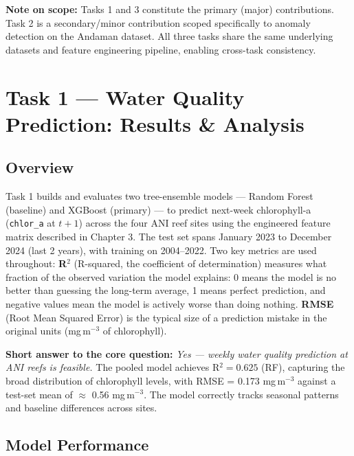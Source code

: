 \documentclass[12pt,a4paper]{report}
\begin{document}
\vspace{1em}
\begin{challengebox}
\textbf{Note on scope:} Tasks 1 and 3 constitute the primary (major) contributions.
Task 2 is a secondary/minor contribution scoped specifically to anomaly detection on
the Andaman dataset. All three tasks share the same underlying datasets and feature
engineering pipeline, enabling cross-task consistency.
\end{challengebox}

\chapter{Task 1 — Water Quality Prediction: Results \& Analysis}

\section{Overview}

Task 1 builds and evaluates two tree-ensemble models — Random Forest (baseline) and
XGBoost (primary) — to predict next-week chlorophyll-a (\texttt{chlor\_a} at $t+1$)
across the four ANI reef sites using the engineered feature matrix described in Chapter 3.
The test set spans January 2023 to December 2024 (last 2 years), with training on
2004--2022. Two key metrics are used throughout:
\textbf{R$^2$} (R-squared, the coefficient of determination) measures what fraction
of the observed variation the model explains: 0 means the model is no better than
guessing the long-term average, 1 means perfect prediction, and negative values mean
the model is actively worse than doing nothing.
\textbf{RMSE} (Root Mean Squared Error) is the typical size of a prediction mistake
in the original units (mg\,m$^{-3}$ of chlorophyll).

\textbf{Short answer to the core question:} \textit{Yes — weekly water quality prediction
at ANI reefs is feasible.} The pooled model achieves R$^2 = 0.625$ (RF), capturing the
broad distribution of chlorophyll levels, with RMSE = 0.173 mg\,m$^{-3}$ against a
test-set mean of $\approx$ 0.56 mg\,m$^{-3}$. The model correctly tracks seasonal
patterns and baseline differences across sites.

\section{Model Performance}
\end{document}
